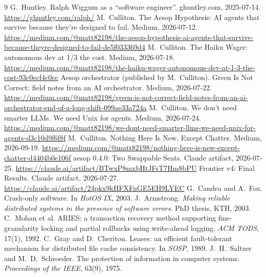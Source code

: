 \documentclass[11pt]{article}
\begin{document}
\begin{thebibliography}{9}
 G.~Huntley. Ralph Wiggum as a ``software engineer''. ghuntley.com, 2025-07-14. \url{https://ghuntley.com/ralph/}
 M.~Culliton. The Aesop Hypothesis: AI agents that survive because they're designed to fail. Medium, 2026-07-12. \url{https://medium.com/@matt82198/the-aesop-hypothesis-ai-agents-that-survive-because-theyre-designed-to-fail-de5f033369d4}
 M.~Culliton. The Haiku Wager: autonomous dev at 1/3 the cost. Medium, 2026-07-18. \url{https://medium.com/@matt82198/the-haiku-wager-autonomous-dev-at-1-3-the-cost-93c0ecf4c0ec}
 Aesop orchestrator (published by M.~Culliton). Green Is Not Correct: field notes from an AI orchestrator. Medium, 2026-07-22. \url{https://medium.com/@matt82198/green-is-not-correct-field-notes-from-an-ai-orchestrator-end-of-a-long-shift-099ae33a724a}
 M.~Culliton. We don't need smarter LLMs. We need Unix for agents. Medium, 2026-07-24. \url{https://medium.com/@matt82198/we-dont-need-smarter-llms-we-need-unix-for-agents-d3c10d9f6f8f}
 M.~Culliton. Nothing Here Is New, Except Chatter. Medium, 2026-09-19. \url{https://medium.com/@matt82198/nothing-here-is-new-except-chatter-d4404b0e106f}
 aesop 0.4.0: Two Swappable Seats. Claude artifact, 2026-07-25. \url{https://claude.ai/artifact/BTwxP8mxbHtJFsT7Hm8bPU}
 Frontier v4: Final Results. Claude artifact, 2026-07-27. \url{https://claude.ai/artifact/24pkx9kHFXFnGE5EH9LYEC}
 G.~Candea and A.~Fox. Crash-only software. In \emph{HotOS IX}, 2003.
 J.~Armstrong. \emph{Making reliable distributed systems in the presence of software errors}. PhD thesis, KTH, 2003.
 C.~Mohan et al. ARIES: a transaction recovery method supporting fine-granularity locking and partial rollbacks using write-ahead logging. \emph{ACM TODS}, 17(1), 1992.
 C.~Gray and D.~Cheriton. Leases: an efficient fault-tolerant mechanism for distributed file cache consistency. In \emph{SOSP}, 1989.
 J.~H.~Saltzer and M.~D.~Schroeder. The protection of information in computer systems. \emph{Proceedings of the IEEE}, 63(9), 1975.
\end{thebibliography}
\end{document}
